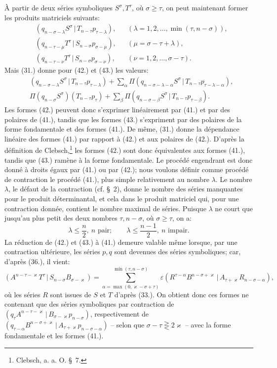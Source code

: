 \documentclass[11pt]{article}
\newcommand{\pair}[2]{(#1\,|\,#2)}
\newcommand{\eps}{\varepsilon}
\begin{document}
À partir de deux séries symboliques $S^\sigma,T^\tau$, où $\sigma\ge\tau$, on peut maintenant former les produits matriciels suivants:
\begin{align}
&\pair{q_{n-\sigma-\lambda}S^\sigma}{T_{n-\tau}p_{\tau-\lambda}}, &&(\lambda=1,2,\ldots,\min(\tau,n-\sigma)),\tag{41}\\
&\pair{q_{n-\tau-\mu}T^\tau}{S_{n-\sigma}p_{\sigma-\mu}}, &&(\mu=\sigma-\tau+\lambda),\tag{42}\\
&\pair{q_{n-\tau-\nu}T^\tau}{S_{n-\sigma}p_{\sigma-\nu}}, &&(\nu=1,2,\ldots,\sigma-\tau).
\tag{43}
\end{align}
Mais (31.) donne pour (42.) et (43.) les valeurs:
\begin{align}
&\pair{q_{n-\sigma-\lambda}S^\sigma}{T_{n-\tau}p_{\tau-\lambda}}
 +\sum_{\alpha}\Pi\pair{q_{n-\sigma-\lambda-\alpha}S^\sigma}{T_{n-\tau}p_{\tau-\lambda-\alpha}},\tag{42a}\\
&\Pi(q_{n-\sigma}S^\sigma)(T_{n-\tau}p_\tau)
 +\sum_{\beta}\Pi\pair{q_{n-\sigma-\beta}S^\sigma}{T_{n-\tau}p_{\tau-\beta}}.
\tag{43a}
\end{align}
Les formes (42.) peuvent donc s'exprimer linéairement par (41.) et par des polaires de (41.), tandis que les formes (43.) s'expriment par des polaires de la forme fondamentale et des formes (41.). De même, (31.) donne la dépendance linéaire des formes (41.) par rapport à (42.) et aux polaires de (42.). D'après la définition de Clebsch,\footnote{Clebsch, a. a. O. \S\ 7.} les formes (42.) sont donc équivalentes aux formes (41.), tandis que (43.) ramène à la forme fondamentale. Le procédé engendrant est donc donné à droits égaux par (41.) ou par (42.); nous voulons définir comme procédé de contraction le procédé (41.), plus simple relativement au nombre $\lambda$. Le nombre $\lambda$, le défaut de la contraction (cf. \S\ 2), donne le nombre des séries manquantes pour le produit déterminantal, et cela dans le produit matriciel qui, pour une contraction donnée, contient le nombre maximal de séries. Puisque $\lambda$ ne court que jusqu'au plus petit des deux nombres $\tau,n-\sigma$, où $\sigma\ge\tau$, on a:
\begin{equation}
 \lambda\le\frac n2,\ n\text{ pair};\qquad
 \lambda\le\frac{n-1}{2},\ n\text{ impair}.
\tag{44}
\end{equation}
La réduction de (42.) et (43.) à (41.) demeure valable même lorsque, par une contraction ultérieure, les séries $p,q$ sont devenues des séries symboliques; car, d'après (36.), il vient:
\[
 \pair{A^{n-\tau-\varkappa}T^\tau}{S_{n-\sigma}B_{\sigma-\varkappa}}
 =\sum_{\alpha=\max(0,\varkappa-\sigma+\tau)}^{\min(\tau,n-\sigma)}
 \eps\pair{R^{\tau-\alpha}B^{n-\sigma+\varkappa}}{A_{\tau+\varkappa}R_{n-\sigma-\alpha}},
\]
où les séries $R$ sont issues de $S$ et $T$ d'après (33.). On obtient donc ces formes ne contenant que des séries symboliques par contraction de $\pair{q_\tau A^{n-\tau-\varkappa}}{B_{\sigma-\varkappa}p_{n-\sigma}}$, respectivement de $\pair{q_{\tau-\alpha}B^{n-\sigma+\varkappa}}{A_{\tau+\varkappa}p_{n-\sigma-\alpha}}$ -- selon que $\sigma-\tau\gtreqless 2\varkappa$ -- avec la forme fondamentale et les formes (41.).
\end{document}
